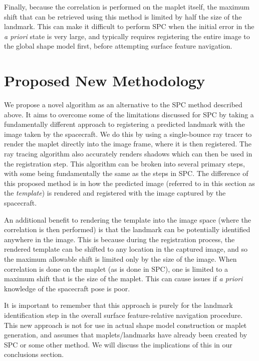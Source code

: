 \documentclass{src/RPI-SIW}
\begin{document}
Finally, because the correlation is performed on the maplet itself, the maximum shift that can be retrieved using this method is limited by half the size of the landmark.  
This can make it difficult to perform SPC when the initial error in the \textit{a priori} state is very large, and typically requires registering the entire image to the global shape model first, before attempting surface feature navigation.

\section*{Proposed New Methodology}
We propose a novel algorithm as an alternative to the SPC method described above.  It aims to overcome some of the limitations discussed for SPC by taking a fundamentally different approach to registering a predicted landmark with the image taken by the spacecraft.  We do this by using a single-bounce ray tracer to render the maplet directly into the image frame, where it is then registered.  The ray tracing algorithm also accurately renders shadows which can then be used in the registration step.  This algorithm can be broken into several primary steps, with some being fundamentally the same as the steps in SPC.  The difference of this proposed method is in how the predicted image (referred to in this section as the \textit{template}) is rendered and registered with the image captured by the spacecraft.

An additional benefit to rendering the template into the image space (where the correlation is then performed) is that the landmark can be potentially identified anywhere in the image.  This is because during the registration process, the rendered template can be shifted to any location in the captured image, and so the maximum allowable shift is limited only by the size of the image.  When correlation is done on the maplet (as is done in SPC), one is limited to a maximum shift that is the size of the maplet.  This can cause issues if \textit{a priori} knowledge of the spacecraft pose is poor.

It is important to remember that this approach is purely for the landmark identification step in the overall surface feature-relative navigation procedure.  This new approach is not for use in actual shape model construction or maplet generation, and assumes that maplets/landmarks have already been created by SPC or some other method.  We will discuss the implications of this in our conclusions section. 
\end{document}

